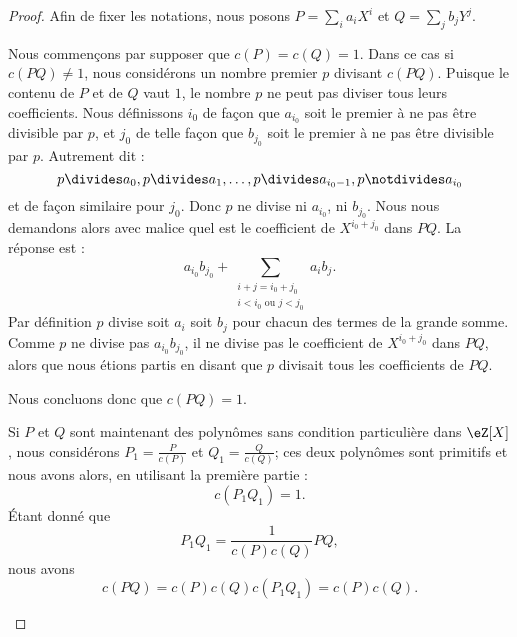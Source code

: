 \begin{proof}
	Afin de fixer les notations, nous posons \( P=\sum_ia_iX^i\) et \( Q=\sum_jb_jY^j\).

	\begin{subproof}

		Nous commençons par supposer que \( c(P)=c(Q)=1\). Dans ce cas si \( c(PQ)\neq 1\), nous considérons un nombre premier \( p\) divisant \( c(PQ)\). Puisque le contenu de \( P\) et de \( Q\) vaut \( 1\), le nombre \( p\) ne peut pas diviser tous leurs coefficients. Nous définissons \( i_0\) de façon que \( a_{i_0}\) soit le premier à ne pas être divisible par \( p\), et \( j_0\) de telle façon que \( b_{j_0}\) soit le premier à ne pas être divisible par \( p\). Autrement dit :
		\begin{equation}
			p\divides a_0, p\divides a_1, \ldots, p\divides a_{i_0-1}, p\notdivides a_{i_0}
		\end{equation}
		et de façon similaire pour \( j_0\). Donc \( p\) ne divise ni \( a_{i_0}\), ni \( b_{j_0}\). Nous nous demandons alors avec malice quel est le coefficient de \( X^{i_0+j_0}\) dans \( PQ\). La réponse est :
		\begin{equation}
			a_{i_0}b_{j_0}+\sum_{\substack{i+j=i_0+j_0\\i<i_0\text{ ou }j<j_0}}a_ib_j.
		\end{equation}
		Par définition \( p\) divise soit \( a_i\) soit \( b_j\) pour chacun des termes de la grande somme. Comme \( p\) ne divise pas \( a_{i_0}b_{j_0}\), il ne divise pas le coefficient de \( X^{i_0+j_0}\) dans \( PQ\), alors que nous étions partis en disant que \( p\) divisait tous les coefficients de \( PQ\).

		Nous concluons donc que \( c(PQ)=1\).


		Si \( P\) et \( Q\) sont maintenant des polynômes sans condition particulière dans \( \eZ[X]\), nous considérons \( P_1=\frac{ P }{ c(P) }\) et \( Q_1=\frac{ Q }{ c(Q) }\); ces deux polynômes sont primitifs et nous avons alors, en utilisant la première partie :
		\begin{equation}
			c(P_1Q_1)=1.
		\end{equation}
		Étant donné que
		\begin{equation}
			P_1Q_1=\frac{1}{ c(P)c(Q) }PQ,
		\end{equation}
		nous avons
		\begin{equation}
			c(PQ)=c(P)c(Q)c(P_1Q_1)=c(P)c(Q).
		\end{equation}
	\end{subproof}
\end{proof}

